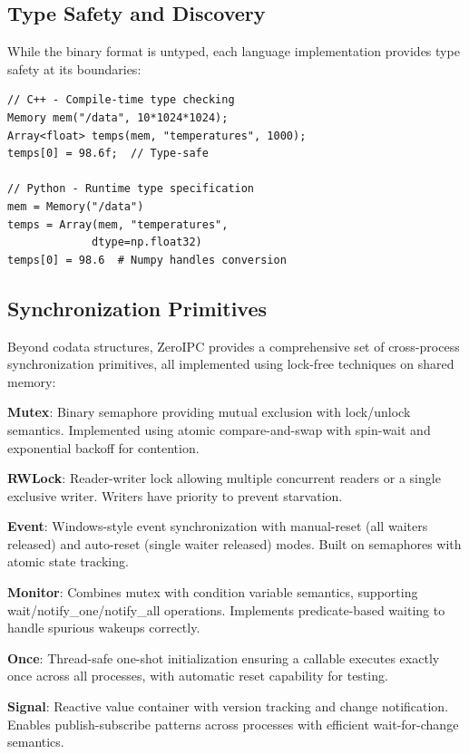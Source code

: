 \documentclass[10pt,conference]{IEEEtran}
\begin{document}
\subsection{Type Safety and Discovery}

While the binary format is untyped, each language implementation provides type safety at its boundaries:

\begin{lstlisting}[caption={Type-Safe Access Pattern},label={lst:typesafe}]
// C++ - Compile-time type checking
Memory mem("/data", 10*1024*1024);
Array<float> temps(mem, "temperatures", 1000);
temps[0] = 98.6f;  // Type-safe

// Python - Runtime type specification
mem = Memory("/data")
temps = Array(mem, "temperatures", 
             dtype=np.float32)
temps[0] = 98.6  # Numpy handles conversion
\end{lstlisting}

\subsection{Synchronization Primitives}

Beyond codata structures, ZeroIPC provides a comprehensive set of cross-process synchronization primitives, all implemented using lock-free techniques on shared memory:

\textbf{Mutex}: Binary semaphore providing mutual exclusion with lock/unlock semantics. Implemented using atomic compare-and-swap with spin-wait and exponential backoff for contention.

\textbf{RWLock}: Reader-writer lock allowing multiple concurrent readers or a single exclusive writer. Writers have priority to prevent starvation.

\textbf{Event}: Windows-style event synchronization with manual-reset (all waiters released) and auto-reset (single waiter released) modes. Built on semaphores with atomic state tracking.

\textbf{Monitor}: Combines mutex with condition variable semantics, supporting wait/notify\_one/notify\_all operations. Implements predicate-based waiting to handle spurious wakeups correctly.

\textbf{Once}: Thread-safe one-shot initialization ensuring a callable executes exactly once across all processes, with automatic reset capability for testing.

\textbf{Signal}: Reactive value container with version tracking and change notification. Enables publish-subscribe patterns across processes with efficient wait-for-change semantics.
\end{document}
